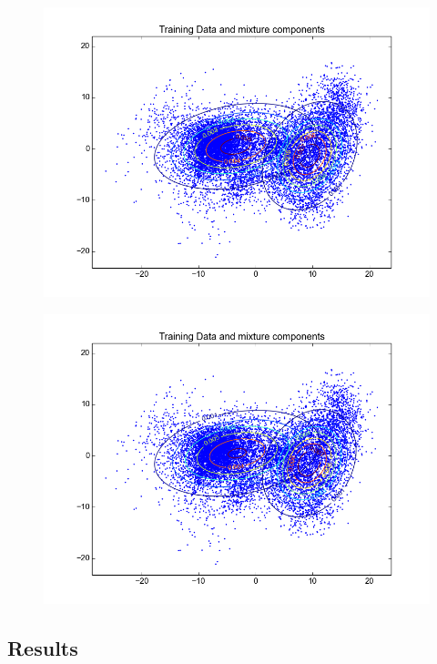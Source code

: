 \documentclass[11pt,a4paper]{article}
\begin{document}
\begin{minipage}[b]{0.25\textwidth}
\begin{figure}[H]
  \centering
  \includegraphics[width=.8\linewidth]{Figures/contours_digittwo15.png}

  \label{fig:sfig1}
\end{figure}%
\end{minipage}
\begin{minipage}[b]{0.25\textwidth}
\begin{figure}[H]
  \centering
  \includegraphics[width=.8\linewidth]{Figures/contours_digittwo20.png}

  \label{fig:sfig1}
\end{figure}%
\end{minipage}
\subsection{Results}
\end{document}
